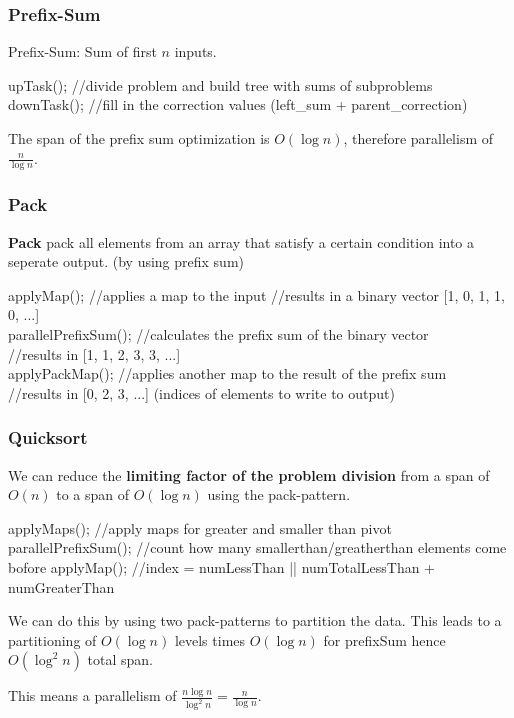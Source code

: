 \subsubsection{Prefix-Sum}

Prefix-Sum: Sum of first $n$ inputs.

\begin{algorithm}
upTask(); //divide problem and build tree with sums of subproblems
downTask(); //fill in the correction values (left_sum + parent_correction)
\end{algorithm}

\begin{theorem}
The span of the prefix sum optimization is $O(\log n)$, therefore parallelism of $\frac{n}{\log n}$.
\end{theorem}

\subsubsection{Pack}

\textbf{Pack} pack all elements from an array that satisfy a certain condition into a seperate output. (by using prefix sum)

\begin{algorithm}
applyMap(); //applies a map to the input
//results in a binary vector [1, 0, 1, 1, 0, ...]\\
parallelPrefixSum(); //calculates the prefix sum of the binary vector\\
//results in [1, 1, 2, 3, 3, ...]\\
applyPackMap(); //applies another map to the result of the prefix sum\\
//results in [0, 2, 3, ...] (indices of elements to write to output)
\end{algorithm}

\subsubsection{Quicksort}

We can reduce the \textbf{limiting factor of the problem division} from a span of $O(n)$ to a span of $O(\log n)$
using the pack-pattern.

\begin{algorithm}
applyMaps(); //apply maps for greater and smaller than pivot
parallelPrefixSum(); //count how many smallerthan/greatherthan elements come bofore
applyMap(); //index = numLessThan || numTotalLessThan + numGreaterThan
\end{algorithm}

We can do this by using two pack-patterns to partition the data. This leads to a partitioning of $O(\log n)$
levels times $O(\log n)$ for prefixSum hence $O(\log^2 n)$ total span. 

This means a parallelism of $\frac{n\log n}{\log^2 n} = \frac{n}{\log n}$.
